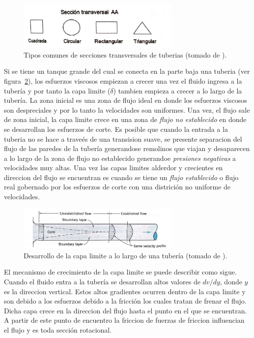 \documentclass[10pt, oneside]{article}
\begin{document}
\begin{figure}[h]
\centering
\includegraphics[width=8cm]{ttub.jpeg}
\caption{Tipos comunes de secciones transversales de tuberias (tomado de \cite{agudelo2011mecanica}).}
\label{ttub}
\end{figure}

Si se tiene un tanque grande del cual se conecta en la parte baja una tuberia (ver figura~\ref{cali}), los esfuerzos viscosos empiezan a crecer una vez el fluido ingresa a la tuber\'ia y por tanto la capa limite ($\delta$) tambien empieza a crecer a lo largo de la tuber\'ia. La zona inicial es una zona de flujo ideal en donde los esfuerzos viscosos son despreciales y por lo tanto la velocidades son uniformes. Una vez, el flujo sale de zona inicial, la capa limite crece en una zona de \emph{flujo no establecido} en donde se desarrollan los esfuerzos de corte. Es posible que cuando la entrada a la tuberia no se hace a trave\'es de una transision suave, se presente separacion del flujo de las paredes de la tuber\'ia generandose remolinos que viajan y desaparecen a lo largo de la zona de flujo no establecido generandoe \emph{presiones negativas} a velocidades muy altas. Una vez las capas limites alderdor y crecientes en direccion del flujo se encuentran es cuando se tiene un \emph{flujo establecido} o flujo real gobernado por los esfuerzos de corte con una districi\'on no uniforme de velocidades.
  

\begin{figure}[h]
\centering
\includegraphics[width=8cm]{cali.jpeg}
\caption{Desarrollo de la capa limite a lo largo de una tuber\'ia (tomado de \cite{street471elementary}).}
\label{cali}
\end{figure}

El mecanismo de crecimiento de la capa limite se puede describir como sigue. Cuando el fluido entra a la tuber\'ia se desarrollan altos valores de $dv/dy$, donde $y$ es la direccion vertical. Estos altos gradientes ocurren dentro de la capa limite y son debido a los esfuerzos debido a la fricci\'on los cuales tratan de frenar el flujo. Dicha capa crece en la direccion del flujo hasta el punto en el que se encuentran. A partir de este punto de encuentro la friccion de fuerzas de friccion influencian el flujo y es toda secci\'on rotacional.
\end{document}
